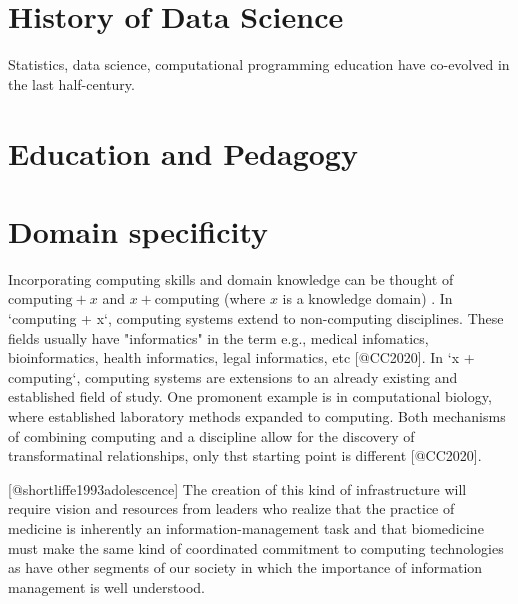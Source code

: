 \documentclass[../main.tex]{subfiles}
\begin{document}
    

    \section{History of Data Science}
        \label{se:intro-ds-history}

        Statistics, data science, computational programming education
        have co-evolved in the last half-century.

        
        
        
        

    \section{Education and Pedagogy}

        
        
        

    \section{Domain specificity}

        Incorporating computing skills and domain knowledge can be thought of
        $\text{computing} + x$ and $x + \text{computing}$ (where $x$ is a knowledge domain)
        \cite{cc2020}.
        In `computing + x`, computing systems extend to non-computing disciplines.
        These fields usually have "informatics" in the term
        e.g., medical infomatics, bioinformatics, health informatics, legal informatics, etc [@CC2020].
        In `x + computing`,
        computing systems are extensions to an already existing and established field of study.
        One promonent example is in computational biology,
        where established laboratory methods expanded to computing.
        Both mechanisms of combining computing and a discipline allow for the discovery of transformatinal relationships,
        only thst starting point is different [@CC2020].


        [@shortliffe1993adolescence]
        The creation of this kind of infrastructure will require vision and resources from leaders who realize that the practice of medicine is inherently an information-management task and that biomedicine must make the same kind of coordinated commitment to computing technologies as have other segments of our society in which the importance of information management is well understood.
\end{document}
